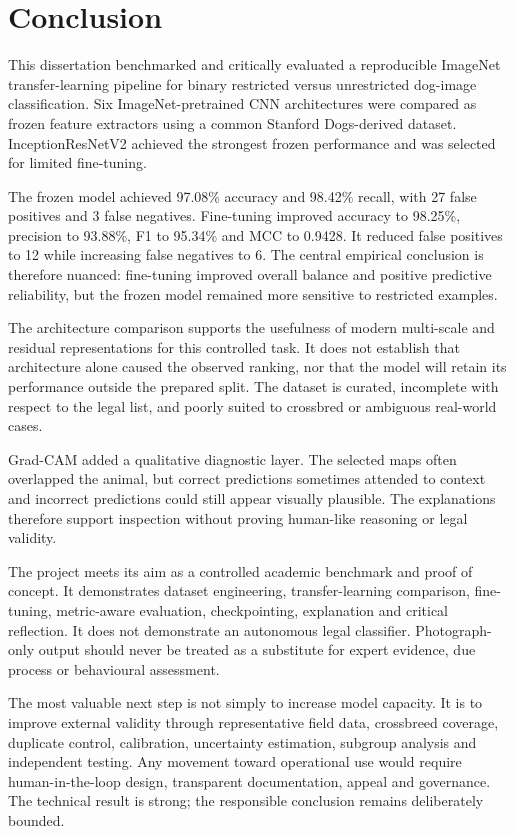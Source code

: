 \chapter{Conclusion}
\label{chap:conclusion}

This dissertation benchmarked and critically evaluated a reproducible ImageNet transfer-learning pipeline for binary restricted versus unrestricted dog-image classification. Six ImageNet-pretrained CNN architectures were compared as frozen feature extractors using a common Stanford Dogs-derived dataset. InceptionResNetV2 achieved the strongest frozen performance and was selected for limited fine-tuning.

The frozen model achieved 97.08\% accuracy and 98.42\% recall, with 27 false positives and 3 false negatives. Fine-tuning improved accuracy to 98.25\%, precision to 93.88\%, F1 to 95.34\% and MCC to 0.9428. It reduced false positives to 12 while increasing false negatives to 6. The central empirical conclusion is therefore nuanced: fine-tuning improved overall balance and positive predictive reliability, but the frozen model remained more sensitive to restricted examples.

The architecture comparison supports the usefulness of modern multi-scale and residual representations for this controlled task. It does not establish that architecture alone caused the observed ranking, nor that the model will retain its performance outside the prepared split. The dataset is curated, incomplete with respect to the legal list, and poorly suited to crossbred or ambiguous real-world cases.

Grad-CAM added a qualitative diagnostic layer. The selected maps often overlapped the animal, but correct predictions sometimes attended to context and incorrect predictions could still appear visually plausible. The explanations therefore support inspection without proving human-like reasoning or legal validity.

The project meets its aim as a controlled academic benchmark and proof of concept. It demonstrates dataset engineering, transfer-learning comparison, fine-tuning, metric-aware evaluation, checkpointing, explanation and critical reflection. It does not demonstrate an autonomous legal classifier. Photograph-only output should never be treated as a substitute for expert evidence, due process or behavioural assessment.

The most valuable next step is not simply to increase model capacity. It is to improve external validity through representative field data, crossbreed coverage, duplicate control, calibration, uncertainty estimation, subgroup analysis and independent testing. Any movement toward operational use would require human-in-the-loop design, transparent documentation, appeal and governance. The technical result is strong; the responsible conclusion remains deliberately bounded.

